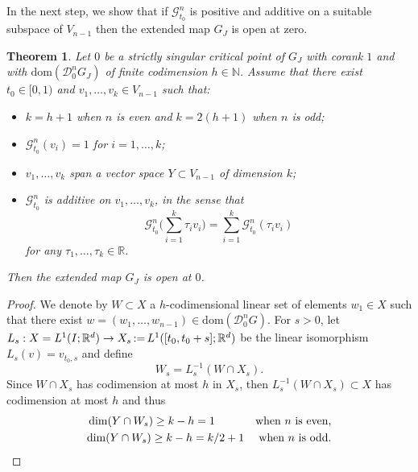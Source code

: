 \documentclass[12pt, reqno]{amsart}
\theoremstyle{plain}
\newtheorem {theorem}{Theorem}[section]
\theoremstyle{definition}
\theoremstyle{remark}
\numberwithin{equation}{section}
\newcommand{\R}{\mathbb{R}}
\newcommand{\N}{\mathbb{N}}
\newcommand{\0}{\theta}
\newcommand{\1}{{-1}}
\renewcommand{\=}{\coloneqq}
\renewcommand{\.}{\dots}
\newcommand{\mc}{\mathcal}
\newcommand{\dom}{\mathrm{dom}}
\begin{document}
In the next step, we show that if $\mc G^n _{t_0}$ is positive and additive on a suitable subspace of $V_{n-1}$
then the extended map $G_J$ is open at zero. 




 

{\color{black}


\begin{theorem}
 \label{endopen} 
 Let $0$ be a strictly singular critical point of $G_J$
 with corank $1$ and with  {\color{black} $\dom(\mc D _0^nG_J)$ of finite codimension $h\in\N$.}
 Assume that there exist $t_0\in[0,1)$ and $v_1,\dots, v_k \in V_{n-1}$ such that:
 \begin{itemize}
 \item[i)]  
 $k= h+1 $ when $n$ is even and {\color{black} $k = 2( h+1)$} when $n$ is odd;
   \item[ii)]  $\mc G^n _{t_0}(v_i)=1$ for $i=1,\dots,k$;
  \item[iii)]  $v_1, \dots, v_k$ span a vector space   $Y\subset V_{n-1}$ of dimension $k$;
    \item[iv)] $\mc G^n _{t_0}$ is additive on $ v_1,\dots, v_k$, in the sense that
    \[
\mc G^n _{t_0}\Big(\sum_{i=1}^k \tau _i v_i\Big) =\sum_{i=1}^k    
\mc G^n _{t_0}( \tau _i v_i)
\]
for any $\tau_1,\ldots,\tau_k\in\R$. 
 \end{itemize}
 
 Then the extended map
   $G_J$ is open at $0$.  
   \end{theorem}



\begin{proof}  We denote by $W \subset X$ a $h$-codimensional linear set of elements $w_1 \in X$ such that there exist $w = (w_1,\ldots,w_{n-1})\in\dom (\mc D^n_0 G)$. 
 For $s>0$,  let $L_s:  X= L^1( I ;\R^d)\to X_s { \,\color{black}:=\, } L^1([t_0,t_0+s];\R^d)$ be the linear isomorphism 
$L_s(v) = v_{t_0,s}$ and define
\[
   W_s = L_s^{-1} (W \cap X_s) .
\]
Since   $W\cap X_s$
has codimension at most $h$ in $X_s$, then $L_s^{-1} (W\cap X_s)\subset X$ has codimension at most $h$ 
and thus
\begin{align}
\label{cicop}
&\dim(Y\cap W_s  )\geq k-h= 1& \textrm{when $n$ is even,}
\\
\label{cicop2}
& {\color{black}
\dim(Y\cap W_s )\geq k-h= k/2+ 1}& \textrm{when $n$ is odd.} 
\end{align}






\end{proof}}
\end{document}
